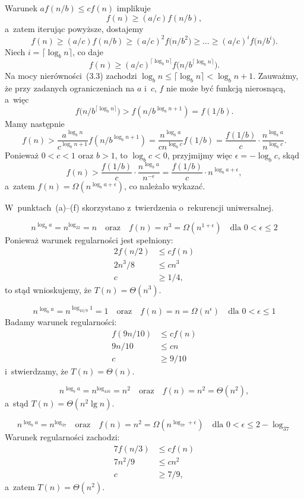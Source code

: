 \exercise %
Warunek $af(n/b)\le cf(n)$ implikuje
\[
	f(n) \ge (a/c)f(n/b),
\]
a~zatem iterując powyższe, dostajemy
\[
	f(n) \ge (a/c)f(n/b) \ge (a/c)^2f\bigl(n/b^2\bigr) \ge \dots \ge (a/c)^if\bigl(n/b^i\bigr).
\]
Niech $i=\lceil\log_bn\rceil$, co daje
\[
	f(n) \ge (a/c)^{\lceil\log_bn\rceil}f\bigl(n/b^{\lceil\log_bn\rceil}\bigr).
\]
Na mocy nierówności~(3.3) zachodzi $\log_bn\le\lceil\log_b n\rceil<\log_bn+1$. Zauważmy, że przy zadanych ograniczeniach na $a$ i~$c$, $f$ nie może być funkcją nierosnącą, a~więc
\[
	f\bigl(n/b^{\lceil\log_bn\rceil}\bigr) > f(n/b^{\log_bn+1}) = f(1/b).
\]
Mamy następnie
\[
	f(n) > \frac{a^{\log_bn}}{c^{\log_bn+1}}f(n/b^{\log_bn+1}) = \frac{n^{\log_ba}}{cn^{\log_bc}}f(1/b) = \frac{f(1/b)}{c}\cdot\frac{n^{\log_ba}}{n^{\log_bc}}.
\]
Ponieważ $0<c<1$ oraz $b>1$, to $\log_bc<0$, przyjmijmy więc $\epsilon=-\log_bc$, skąd
\[
	f(n) > \frac{f(1/b)}{c}\cdot\frac{n^{\log_ba}}{n^{-\epsilon}} = \frac{f(1/b)}{c}\cdot n^{\log_ba+\epsilon},
\]
a~zatem $f(n)=\Omega(n^{\log_ba+\epsilon})$, co należało wykazać.

\problems

W~punktach~(a)\nobreakdash--(f) skorzystano z~twierdzenia o~rekurencji uniwersalnej.

\subproblem %
\[
	n^{\log_ba} = n^{\log_22} = n \quad\text{oraz}\quad f(n) = n^3 = \Omega(n^{1+\epsilon}) \quad\text{dla $0<\epsilon\le2$}
\]
Ponieważ warunek regularności jest spełniony:
\begin{align*}
	2f(n/2) &\le cf(n) \\
	2n^3\!/8 &\le cn^3 \\
	c &\ge 1/4,
\end{align*}
to stąd wnioskujemy, że $T(n)=\Theta(n^3)$.

\subproblem %
\[
	n^{\log_ba} = n^{\log_{10/9}1} = 1 \quad\text{oraz}\quad f(n) = n = \Omega(n^\epsilon) \quad\text{dla $0<\epsilon\le1$}
\]
Badamy warunek regularności:
\begin{align*}
	f(9n/10) &\le cf(n) \\
	9n/10 &\le cn \\
	c &\ge 9/10
\end{align*}
i~stwierdzamy, że $T(n)=\Theta(n)$.

\subproblem %
\[
	n^{\log_ba} = n^{\log_416} = n^2 \quad\text{oraz}\quad f(n) = n^2 = \Theta(n^2),
\]
a~stąd $T(n)=\Theta(n^2\lg n)$.

\subproblem %
\[
	n^{\log_ba} = n^{\log_37} \quad\text{oraz}\quad f(n) = n^2 = \Omega(n^{\log_37+\epsilon}) \quad\text{dla $0<\epsilon\le2-\log_37$}
\]
Warunek regularności zachodzi:
\begin{align*}
	7f(n/3) &\le cf(n) \\
	7n^2\!/9 &\le cn^2 \\
	c &\ge 7/9,
\end{align*}
a~zatem $T(n)=\Theta(n^2)$.

